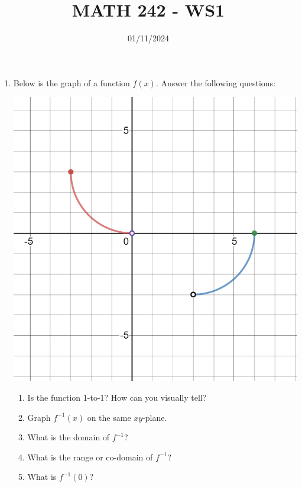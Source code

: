 \documentclass[12pt]{article}
\title{MATH 242 - WS1}
\date{01/11/2024}
\begin{document}
\maketitle


\begin{enumerate}

\item Below is the graph of a function $f(x)$. Answer the following questions:

\begin{center}
    \includegraphics[scale=.45]{inverse.png} 
\end{center}

\begin{enumerate}
\item Is the function 1-to-1? How can you visually tell?
\vfill

\item Graph $f^{-1}(x)$ on the same $xy$-plane.
\vfill

\item  What is the domain of $f^{-1}$?
\vfill

\item What is the range or co-domain of $f^{-1}$?
\vfill

\item What is $f^{-1}(0)$?
\vfill
\end{enumerate}


\end{enumerate}
\end{document}
